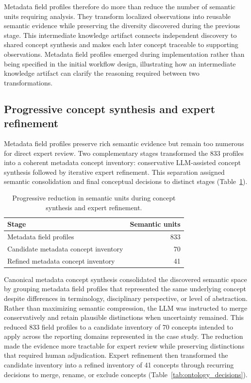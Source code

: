 \documentclass{article}
\begin{document}
Metadata field profiles therefore do more than reduce the number of semantic units requiring analysis. They transform localized observations into reusable semantic evidence while preserving the diversity discovered during the previous stage. This intermediate knowledge artifact connects independent discovery to shared concept synthesis and makes each later concept traceable to supporting observations. Metadata field profiles emerged during implementation rather than being specified in the initial workflow design, illustrating how an intermediate knowledge artifact can clarify the reasoning required between two transformations.

\subsection{Progressive concept synthesis and expert refinement}

Metadata field profiles preserve rich semantic evidence but remain too numerous for direct expert review. Two complementary stages transformed the 833 profiles into a coherent metadata concept inventory: conservative LLM-assisted concept synthesis followed by iterative expert refinement. This separation assigned semantic consolidation and final conceptual decisions to distinct stages (Table~\ref{tab:ontology_progression}).

\begin{table}[!ht]
    \centering
    \caption{Progressive reduction in semantic units during concept synthesis and expert refinement.}
    \label{tab:ontology_progression}
    \begin{tabular}{lr}
    \toprule
        \textbf{Stage} & \textbf{Semantic units} \\
        \midrule
        Metadata field profiles & 833 \\
        Candidate metadata concept inventory & 70 \\
        Refined metadata concept inventory & 41 \\
    \bottomrule
    \end{tabular}
\end{table}

Canonical metadata concept synthesis consolidated the discovered semantic space by grouping metadata field profiles that represented the same underlying concept despite differences in terminology, disciplinary perspective, or level of abstraction. Rather than maximizing semantic compression, the LLM was instructed to merge conservatively and retain plausible distinctions when uncertainty remained. This reduced 833 field profiles to a candidate inventory of 70 concepts intended to apply across the reporting domains represented in the case study. The reduction made the evidence more tractable for expert review while preserving distinctions that required human adjudication. Expert refinement then transformed the candidate inventory into a refined inventory of 41 concepts through recurring decisions to merge, rename, or exclude concepts (Table~\ref{tab:ontology_decisions}).
\end{document}
